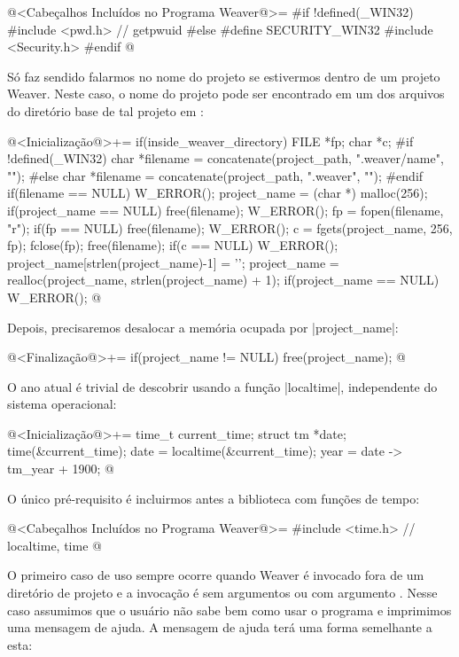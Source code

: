 {@<Cabeçalhos Incluídos no Programa Weaver@>=
#if !defined(_WIN32)
#include <pwd.h> // getpwuid
#else
#define SECURITY_WIN32
#include <Security.h>
#endif
@


Só faz sendido falarmos no nome do projeto se estivermos dentro de um
projeto Weaver. Neste caso, o nome do projeto pode ser encontrado em
um dos arquivos do diretório base de tal projeto em
:

\iniciocodigo
@<Inicialização@>+=
if(inside_weaver_directory){
  FILE *fp;
  char *c;
#if !defined(_WIN32)
  char *filename = concatenate(project_path, ".weaver/name", "");
#else
  char *filename = concatenate(project_path, ".weaver\name", "");
#endif
  if(filename == NULL) W_ERROR();
  project_name = (char *) malloc(256);
  if(project_name == NULL){
    free(filename);
    W_ERROR();
  }
  fp = fopen(filename, "r");
  if(fp == NULL){
    free(filename);
    W_ERROR();
  }
  c = fgets(project_name, 256, fp);
  fclose(fp);
  free(filename);
  if(c == NULL) W_ERROR();
  project_name[strlen(project_name)-1] = '\0';
  project_name = realloc(project_name, strlen(project_name) + 1);
  if(project_name == NULL) W_ERROR();
}
@
\fimcodigo

Depois, precisaremos desalocar a memória ocupada por |project_name|:

\iniciocodigo
@<Finalização@>+=
if(project_name != NULL) free(project_name);
@
\fimcodigo


O ano atual é trivial de descobrir usando a função |localtime|,
independente do sistema operacional:

\iniciocodigo
@<Inicialização@>+=
{
  time_t current_time;
  struct tm *date;
  time(&current_time);
  date = localtime(&current_time);
  year = date -> tm_year + 1900;
}
@
\fimcodigo

O único pré-requisito é incluirmos antes a biblioteca com funções de
tempo:

\iniciocodigo
@<Cabeçalhos Incluídos no Programa Weaver@>=
#include <time.h> // localtime, time
@
\fimcodigo



O primeiro caso de uso sempre ocorre quando Weaver é invocado fora de
um diretório de projeto e a invocação é sem argumentos ou com
argumento . Nesse caso assumimos que o usuário não sabe
bem como usar o programa e imprimimos uma mensagem de ajuda. A mensagem
de ajuda terá uma forma semelhante a esta:

}
